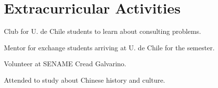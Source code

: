 \section{Extracurricular Activities \faStar}

Club for U. de Chile students to learn about consulting problems.
\sectionsep

Mentor for exchange students arriving at U. de Chile for the semester.
\sectionsep

Volunteer at SENAME Cread Galvarino.
\sectionsep

Attended to study about Chinese history and culture.
\sectionsep